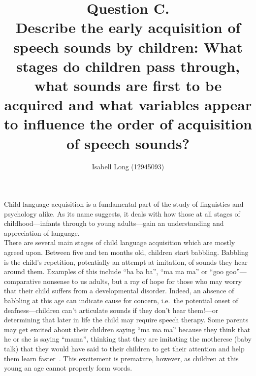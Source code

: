 \documentclass[12pt]{article}
\begin{document}
\title{Question C.\\
       \small{Describe the early acquisition of speech sounds by
              children: What stages do children pass through, what sounds are
              first to be acquired and what variables appear to influence the order
              of acquisition of speech sounds?}}
\author{Isabell Long (12945093)}
\maketitle

Child language acquisition is a fundamental part of the study of
linguistics and psychology alike. As its name suggests, it deals with
how those at all stages of childhood---infants through to young
adults---gain an understanding and appreciation of language.\\

There are several main stages of child language acquisition which are
mostly agreed upon. Between five and ten months old, children start
babbling.  Babbling is the child's repetition, potentially an attempt
at imitation, of sounds they hear around them. Examples of this
include ``ba ba ba'', ``ma ma ma'' or ``goo goo''---comparative
nonsense to us adults, but a ray of hope for those who may worry that
their child suffers from a developmental disorder. Indeed, an absence
of babbling at this age can indicate cause for concern, i.e.\ the
potential onset of deafness---children can't articulate sounds if they
don't hear them!---or determining that later in life the child may
require speech therapy. Some parents may get excited about their
children saying ``ma ma ma'' because they think that he or she is
saying ``mama'', thinking that they are imitating the motherese (baby
talk) that they would have said to their children to get their
attention and help them learn faster~\cite{baby-talk-helps-learning}.
This excitement is premature, however, as children at this young an
age cannot properly form words.\\
\end{document}
